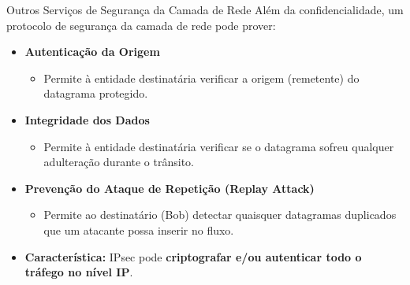 \begin{frame}{Outros Serviços de Segurança da Camada de Rede}
    Além da confidencialidade, um protocolo de segurança da camada de rede pode prover:
    \begin{itemize}

        \item \textbf{Autenticação da Origem}
              \begin{itemize}
                  \item Permite à entidade destinatária verificar a origem (remetente) do datagrama protegido.
              \end{itemize}

        \item \textbf{Integridade dos Dados}
              \begin{itemize}
                  \item Permite à entidade destinatária verificar se o datagrama sofreu qualquer adulteração durante o trânsito.
              \end{itemize}

        \item \textbf{Prevenção do Ataque de Repetição (Replay Attack)}
              \begin{itemize}
                  \item Permite ao destinatário (Bob) detectar quaisquer datagramas duplicados que um atacante possa inserir no fluxo.
              \end{itemize}
        \item \textbf{Característica:} IPsec pode \textbf{criptografar e/ou autenticar todo o tráfego no nível IP}.
    \end{itemize}


\end{frame}
